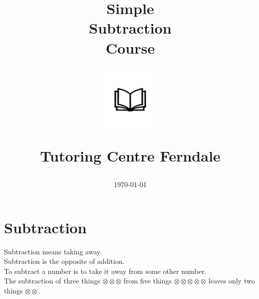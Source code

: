 \documentclass[12pt]{article}
\title{Simple\\Subtraction\\Course\\
\begin{center}
\includegraphics[width=4em]{ApS_logo.png}
\end{center}
\begin{normalsize}Tutoring Centre Ferndale \end{normalsize}}
\author{}
\date{\today}
\begin{document}
\maketitle

\section*{Subtraction}

Subtraction means taking away.\\

Subtraction is the opposite of addition.\\

To subtract a number is to take it away from some other number.\\

The subtraction of three things $\otimes\otimes\otimes$ from five things $\otimes\otimes\otimes\otimes\otimes$ leaves only two things $\otimes\otimes$.\\

\newpage
\end{document}
